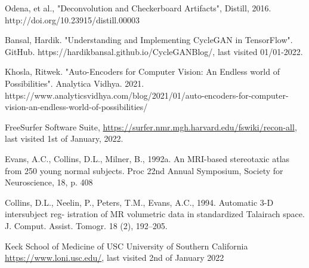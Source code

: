 \documentclass[12pt, fleqn, titlepage]{article}
\begin{document}
\begin{thebibliography}{9}
		 Odena, et al., "Deconvolution and Checkerboard Artifacts", Distill, 2016. http://doi.org/10.23915/distill.00003
		
		 Bansal, Hardik. "Understanding and Implementing CycleGAN in TensorFlow". GitHub. https://hardikbansal.github.io/CycleGANBlog/, last visited 01/01-2022.
		
		 Khosla, Ritwek. "Auto-Encoders for Computer Vision: An Endless world of Possibilities". Analytica Vidhya. 2021. https://www.analyticsvidhya.com/blog/2021/01/auto-encoders-for-computer-vision-an-endless-world-of-possibilities/

		 FreeSurfer Software Suite, \url{https://surfer.nmr.mgh.harvard.edu/fswiki/recon-all}, last visited 1st of January, 2022.
		
		 Evans, A.C., Collins, D.L., Milner, B., 1992a. An MRI-based stereotaxic atlas from 250 young normal subjects. Proc 22nd Annual Symposium, Society for Neuroscience, 18, p. 408
		
		 Collins, D.L., Neelin, P., Peters, T.M., Evans, A.C., 1994. Automatic 3-D intersubject reg- istration of MR volumetric data in standardized Talairach space. J. Comput. Assist. Tomogr. 18 (2), 192–205.
		
		 Keck School of Medicine of USC University of Southern California \url{https://www.loni.usc.edu/}, last visited 2nd of January 2022
		
	\end{thebibliography}
	
	
	\newpage
	
	
	
	
	
	
\end{document}
